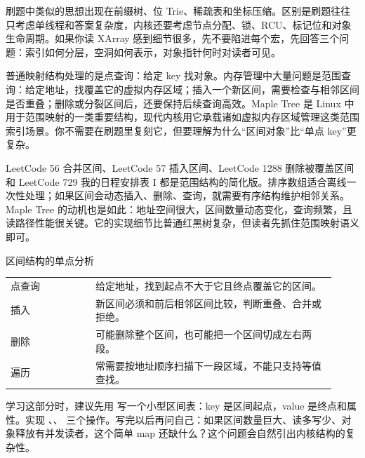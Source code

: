 刷题中类似的思想出现在前缀树、位 Trie、稀疏表和坐标压缩。区别是刷题往往只考虑单线程和答案复杂度，内核还要考虑节点分配、锁、RCU、标记位和对象生命周期。如果你读 XArray 感到细节很多，先不要陷进每个宏，先回答三个问题：索引如何分层，空洞如何表示，对象指针何时对读者可见。


普通映射结构处理的是点查询：给定 key 找对象。内存管理中大量问题是范围查询：给定地址，找覆盖它的虚拟内存区域；插入一个新区间，需要检查与相邻区间是否重叠；删除或分裂区间后，还要保持后续查询高效。Maple Tree 是 Linux 中用于范围映射的一类重要结构，现代内核用它承载诸如虚拟内存区域管理这类范围索引场景。你不需要在刷题里复刻它，但要理解为什么“区间对象”比“单点 key”更复杂。

LeetCode 56 合并区间、LeetCode 57 插入区间、LeetCode 1288 删除被覆盖区间 和 LeetCode 729 我的日程安排表 I 都是范围结构的简化版。排序数组适合离线一次性处理；如果区间会动态插入、删除、查询，就需要有序结构维护相邻关系。Maple Tree 的动机也是如此：地址空间很大，区间数量动态变化，查询频繁，且读路径性能很关键。它的实现细节比普通红黑树复杂，但读者先抓住范围映射语义即可。

\begin{principlebox}{区间结构的单点分析}
\begin{tabular}{@{}p{0.24\linewidth}p{0.68\linewidth}@{}}
点查询 & 给定地址，找到起点不大于它且终点覆盖它的区间。\\
插入 & 新区间必须和前后相邻区间比较，判断重叠、合并或拒绝。\\
删除 & 可能删除整个区间，也可能把一个区间切成左右两段。\\
遍历 & 常需要按地址顺序扫描下一段区域，不能只支持等值查找。\\
\end{tabular}
\end{principlebox}

学习这部分时，建议先用  写一个小型区间表：key 是区间起点，value 是终点和属性。实现 、、 三个操作。写完以后再问自己：如果区间数量巨大、读多写少、对象释放有并发读者，这个简单 map 还缺什么？这个问题会自然引出内核结构的复杂性。


